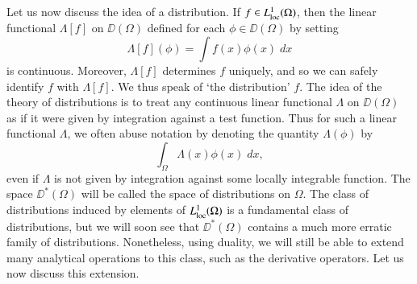 
Let us now discuss the idea of a distribution. If $f \in L^1_{\text{loc}}(\Omega)$, then the linear functional $\Lambda[f]$ on $\DD(\Omega)$ defined for each $\phi \in \DD(\Omega)$ by setting
%
\[ \Lambda[f](\phi) = \int f(x) \phi(x)\; dx \]
%
is continuous. Moreover, $\Lambda[f]$ determines $f$ uniquely, and so we can safely identify $f$ with $\Lambda[f]$. We thus speak of `the distribution' $f$. The idea of the theory of distributions is to treat any continuous linear functional $\Lambda$ on $\DD(\Omega)$ as if it were given by integration against a test function. Thus for such a linear functional $\Lambda$, we often abuse notation by denoting the quantity $\Lambda(\phi)$ by
%
\[ \int_\Omega \Lambda(x) \phi(x)\; dx, \]
%
even if $\Lambda$ is not given by integration against some locally integrable function. The space $\DD^*(\Omega)$ will be called the space of distributions on $\Omega$. The class of distributions induced by elements of $L^1_{\text{loc}}(\Omega)$ is a fundamental class of distributions, but we will soon see that $\DD^*(\Omega)$ contains a much more erratic family of distributions. Nonetheless, using duality, we will still be able to extend many analytical operations to this class, such as the derivative operators. Let us now discuss this extension.

